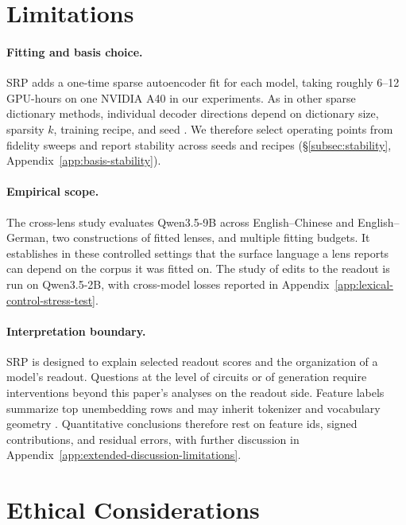 \section*{Limitations}

\paragraph{Fitting and basis choice.}
SRP adds a one-time sparse autoencoder fit for each model, taking roughly
6--12 GPU-hours on one NVIDIA A40 in our experiments. As in other sparse
dictionary methods, individual decoder directions depend on dictionary size,
sparsity \(k\), training recipe, and seed
\citep{elhage2022superposition,karvonen2025saebench,makelov2024principled,paulo2025stability}.
We therefore select operating points from fidelity sweeps and report stability
across seeds and recipes
(\S\ref{subsec:stability}, Appendix~\ref{app:basis-stability}).

\paragraph{Empirical scope.}
The cross-lens study evaluates Qwen3.5-9B across English--Chinese and
English--German, two constructions of fitted lenses, and multiple fitting
budgets. It establishes in these controlled settings that the surface language
a lens reports can depend on the corpus it was fitted on. The study of edits to
the readout is run on Qwen3.5-2B, with cross-model losses reported in
Appendix~\ref{app:lexical-control-stress-test}.

\paragraph{Interpretation boundary.}
SRP is designed to explain selected readout scores and the organization of a
model's readout. Questions at the level of circuits or of generation require
interventions beyond this paper's analyses on the readout side. Feature labels summarize
top unembedding rows and may inherit tokenizer and vocabulary geometry
\citep{press2017outputembedding,inan2017tying,yang2018softmaxbottleneck,bostrom2020bpe}.
Quantitative conclusions therefore rest on feature ids, signed contributions,
and residual errors, with further discussion in
Appendix~\ref{app:extended-discussion-limitations}.

\section*{Ethical Considerations}

